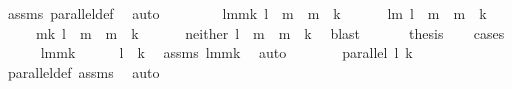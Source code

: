 \begin{isabellebody}
\ assms\ parallel{\isacharunderscore}{\kern0pt}def\ \isamarkupfalse%
\ auto\isanewline
\ \ \isamarkupfalse%
\ \isanewline
\ \ \ \ {\isacharparenleft}{\kern0pt}lmmk{\isacharparenright}{\kern0pt}\ {\isachardoublequoteopen}{\isacharparenleft}{\kern0pt}l\ {\isacharequal}{\kern0pt}\ m{\isacharparenright}{\kern0pt}{\isachardoublequoteclose}\ \ {\isachardoublequoteopen}{\isacharparenleft}{\kern0pt}m\ {\isacharequal}{\kern0pt}\ k{\isacharparenright}{\kern0pt}{\isachardoublequoteclose}\ \isanewline
\ \ \ \ {\isacharbar}{\kern0pt}\ {\isacharparenleft}{\kern0pt}lm{\isacharparenright}{\kern0pt}\ {\isachardoublequoteopen}{\isacharparenleft}{\kern0pt}l\ {\isacharequal}{\kern0pt}\ m{\isacharparenright}{\kern0pt}{\isachardoublequoteclose}\ \ {\isachardoublequoteopen}{\isacharparenleft}{\kern0pt}m\ {\isasymnoteq}\ k{\isacharparenright}{\kern0pt}{\isachardoublequoteclose}\ \isanewline
\ \ \ \ {\isacharbar}{\kern0pt}\ {\isacharparenleft}{\kern0pt}mk{\isacharparenright}{\kern0pt}\ {\isachardoublequoteopen}{\isacharparenleft}{\kern0pt}l\ {\isasymnoteq}\ m{\isacharparenright}{\kern0pt}{\isachardoublequoteclose}\ \ {\isachardoublequoteopen}{\isacharparenleft}{\kern0pt}m\ {\isacharequal}{\kern0pt}\ k{\isacharparenright}{\kern0pt}{\isachardoublequoteclose}\ \isanewline
\ \ \ \ {\isacharbar}{\kern0pt}\ {\isacharparenleft}{\kern0pt}neither{\isacharparenright}{\kern0pt}\ {\isachardoublequoteopen}{\isacharparenleft}{\kern0pt}l\ {\isasymnoteq}\ m{\isacharparenright}{\kern0pt}{\isachardoublequoteclose}\ \ {\isachardoublequoteopen}{\isacharparenleft}{\kern0pt}m\ {\isasymnoteq}\ k{\isacharparenright}{\kern0pt}{\isachardoublequoteclose}\ \isamarkupfalse%
\ blast\isanewline
\ \ \isamarkupfalse%
\ \isamarkupfalse%
\ \ {\isacharquery}{\kern0pt}thesis\isanewline
\ \ \isamarkupfalse%
\ cases\isanewline
\ \ \ \ \isamarkupfalse%
\ lmmk\isanewline
\ \ \ \ \isamarkupfalse%
\ {\isachardoublequoteopen}l\ {\isacharequal}{\kern0pt}\ k{\isachardoublequoteclose}\ \isamarkupfalse%
\ assms\ lmmk\ \isamarkupfalse%
\ auto\isanewline
\ \ \ \ \isamarkupfalse%
\ \isamarkupfalse%
\ {\isachardoublequoteopen}parallel\ l\ k{\isachardoublequoteclose}\ \isamarkupfalse%
\ parallel{\isacharunderscore}{\kern0pt}def\ assms\ \isamarkupfalse%
\ auto\isanewline
\ \ \ \ \isamarkupfalse%

\end{isabellebody}
